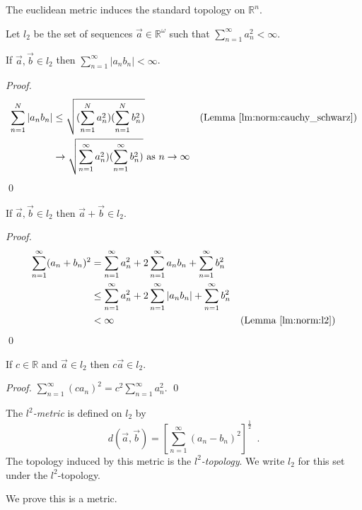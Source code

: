 \begin{cor}
  The euclidean metric induces the standard topology on $\mathbb{R}^n$.
\end{cor}

\begin{df}
  Let $l_2$ be the set of sequences $\vec{a} \in \mathbb{R}^\omega$ such that
  $\sum_{n=1}^\infty a_n^2 < \infty$.
\end{df}

\begin{lm}
  \label{lm:norm:l2}
  If $\vec{a}, \vec{b} \in l_2$ then $\sum_{n=1}^\infty |a_n b_n| < \infty$.
\end{lm}

\begin{proof}
  \pf
  \begin{align*}
    \sum_{n=1}^N |a_n b_n| & \leq \sqrt{(\sum_{n=1}^N a_n^2) (\sum_{n=1}^N
      b_n^2)} & (\text{Lemma \ref{lm:norm:cauchy_schwarz}}) \\
    & \rightarrow \sqrt{\sum_{n=1}^\infty a_n^2) (\sum_{n=1}^\infty b_n^2)}
    \text{ as } n \rightarrow \infty
  \end{align*}
  \qed
\end{proof}

\begin{lm}
  If $\vec{a}, \vec{b} \in l_2$ then $\vec{a} + \vec{b} \in l_2$.
\end{lm}

\begin{proof}
  \pf
  \begin{align*}
    \sum_{n=1}^\infty (a_n + b_n)^2 & = \sum_{n=1}^\infty a_n^2 + 2
    \sum_{n=1}^\infty a_n b_n + \sum_{n=1}^\infty b_n^2 \\
    & \leq \sum_{n=1}^\infty a_n^2 + 2 \sum_{n=1}^\infty |a_n b_n| +
    \sum_{n=1}^\infty b_n^2 \\
    & < \infty & (\text{Lemma \ref{lm:norm:l2}})
  \end{align*}
  \qed
\end{proof}

\begin{lm}
  If $c \in \mathbb{R}$ and $\vec{a} \in l_2$ then $c \vec{a} \in l_2$.
\end{lm}

\begin{proof}
  \pf $\sum_{n=1}^\infty (c a_n)^2 = c^2 \sum_{n=1}^\infty a_n^2$. \qed
\end{proof}

\begin{df}
  The \emph{$l^2$-metric} is defined on $l_2$ by
  \[ d(\vec{a}, \vec{b}) = \left[ \sum_{n=1}^\infty (a_n -
  b_n)^2 \right]^{\frac{1}{2}} \enspace . \] The topology induced by this
  metric
  is the \emph{$l^2$-topology}. We write $l_2$ for this set under the
  $l^2$-topology.

  We prove this is a metric.
\end{df}

